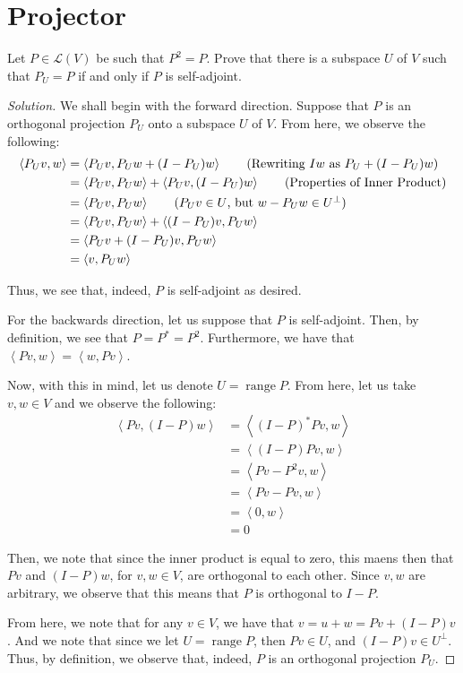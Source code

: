 \documentclass{article}
\newenvironment{solution}{\begin{proof}[Solution]}{\end{proof}}
\DeclareMathOperator*{\vrange}{\mathrm{range}}
\newcommand{\innerproduct}[2]{\left\langle{#1}, {#2}\right\rangle}
\begin{document}
\section{Projector}
\begin{hw}
	Let $P \in \mathcal L(V)$ be such that $P^{2} = P$. Prove that there is a subspace $U$ of $V$ such that $P_{U} = P$ if and only if $P$ is self-adjoint.
\end{hw}
\begin{solution}
	We shall begin with the forward direction. Suppose that $P$ is an orthogonal projection $P_{U}$ onto a subspace $U$ of $V$. From here, we observe the following:
	\begin{align*}
		\innerproduct{P_{U}v}{w} &= \innerproduct{P_{U}v}{P_{U}w + (I - P_{U})w} \tag{Rewriting $Iw$ as $P_{U} + (I - P_{U})w$}\\
		&= \innerproduct{P_{U}v}{P_{U}w} + \innerproduct{P_{U}v}{(I - P_{U})w} \tag{Properties of Inner Product}\\
		&= \innerproduct{P_{U}v}{P_{U}w} \tag{$P_{U}v \in U$, but $w - P_{U}w \in U^{\perp}$}\\
		&= \innerproduct{P_{U}v}{P_{U}w} + \innerproduct{(I - P_{U})v}{P_{U}w} \\
		&= \innerproduct{P_{U}v + (I - P_{U})v}{P_{U}w} \\
		&= \innerproduct{v}{P_{U}w}
	\end{align*}

	Thus, we see that, indeed, $P$ is self-adjoint as desired.
	
	For the backwards direction, let us suppose that $P$ is self-adjoint. Then, by definition, we see that $P = P^{*} = P^{2}$. Furthermore, we have that $\innerproduct{Pv}{w} = \innerproduct{w}{Pv}$.
	
	Now, with this in mind, let us denote $U = \vrange P$. From here, let us take $v,w \in V$ and we observe the following:
	\begin{align*}
		\innerproduct{Pv}{(I - P)w} &= \innerproduct{(I-P)^{*}Pv}{w} \\
		&= \innerproduct{(I-P)Pv}{w} \\
		&= \innerproduct{Pv - P^{2}v}{w} \\
		&= \innerproduct{Pv - Pv}{w} \\
		&= \innerproduct{0}{w} \\
		&= 0
	\end{align*}

	Then, we note that since the inner product is equal to zero, this maens then that $Pv$ and $(I - P)w$, for $v, w \in V$, are orthogonal to each other. Since $v,w$ are arbitrary, we observe that this means that $P$ is orthogonal to $I - P$.
	
	From here, we note that for any $v \in V$, we have that $v = u + w = Pv + (I - P)v$. And we note that since we let $U = \vrange P$, then $Pv \in U$, and $(I - P)v \in U^{\perp}$. Thus, by definition, we observe that, indeed, $P$ is an orthogonal projection $P_{U}$.
\end{solution}
\end{document}

